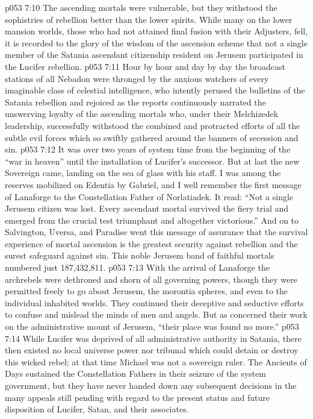 \pc \vs p053 7:10 The ascending mortals were vulnerable, but they withstood the sophistries of rebellion better than the lower spirits. While many on the lower mansion worlds, those who had not attained final fusion with their Adjusters, fell, it is recorded to the glory of the wisdom of the ascension scheme that not a single member of the Satania ascendant citizenship resident on Jerusem participated in the Lucifer rebellion.
\vs p053 7:11 Hour by hour and day by day the broadcast stations of all Nebadon were thronged by the anxious watchers of every imaginable class of celestial intelligence, who intently perused the bulletins of the Satania rebellion and rejoiced as the reports continuously narrated the unswerving loyalty of the ascending mortals who, under their Melchizedek leadership, successfully withstood the combined and protracted efforts of all the subtle evil forces which so swiftly gathered around the banners of secession and sin.
\vs p053 7:12 It was over two years of system time from the beginning of the “war in heaven” until the installation of Lucifer’s successor. But at last the new Sovereign came, landing on the sea of glass with his staff. I was among the reserves mobilized on Edentia by Gabriel, and I well remember the first message of Lanaforge to the Constellation Father of Norlatiadek. It read: “Not a single Jerusem citizen was lost. Every ascendant mortal survived the fiery trial and emerged from the crucial test triumphant and altogether victorious.” And on to Salvington, Uversa, and Paradise went this message of assurance that the survival experience of mortal ascension is the greatest security against rebellion and the surest safeguard against sin. This noble Jerusem band of faithful mortals numbered just 187,432,811.
\pc \vs p053 7:13 With the arrival of Lanaforge the archrebels were dethroned and shorn of all governing powers, though they were permitted freely to go about Jerusem, the morontia spheres, and even to the individual inhabited worlds. They continued their deceptive and seductive efforts to confuse and mislead the minds of men and angels. But as concerned their work on the administrative mount of Jerusem, “their place was found no more.”
\pc \vs p053 7:14 While Lucifer was deprived of all administrative authority in Satania, there then existed no local universe power nor tribunal which could detain or destroy this wicked rebel; at that time Michael was not a sovereign ruler. The Ancients of Days sustained the Constellation Fathers in their seizure of the system government, but they have never handed down any subsequent decisions in the many appeals still pending with regard to the present status and future disposition of Lucifer, Satan, and their associates.
